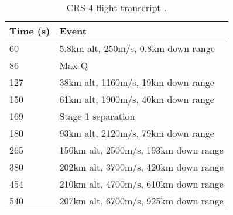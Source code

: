 \begin{table}[!htb]
\centering
\begin{tabular}{|l|l|}
\hline
\rowcolor[HTML]{C0C0C0} 
Time (s) & Event                                \\ \hline
60       & 5.8km alt, 250m/s, 0.8km down range  \\ \hline
\rowcolor[HTML]{EFEFEF} 
86       & Max Q                                \\ \hline
127      & 38km alt, 1160m/s, 19km down range   \\ \hline
\rowcolor[HTML]{EFEFEF} 
150      & 61km alt, 1900m/s, 40km down range   \\ \hline
169      & Stage 1 separation                   \\ \hline
\rowcolor[HTML]{EFEFEF} 
180      & 93km alt, 2120m/s, 79km down range   \\ \hline
265      & 156km alt, 2500m/s, 193km down range \\ \hline
\rowcolor[HTML]{EFEFEF} 
380     & 202km alt, 3700m/s, 420km down range \\ \hline
454      & 210km alt, 4700m/s, 610km down range \\ \hline
\rowcolor[HTML]{EFEFEF} 
540      & 207km alt, 6700m/s, 925km down range \\ \hline
\end{tabular}
\caption{CRS-4 flight transcript \cite{CRS4}.}
\label{tab:CRS4}
\end{table}